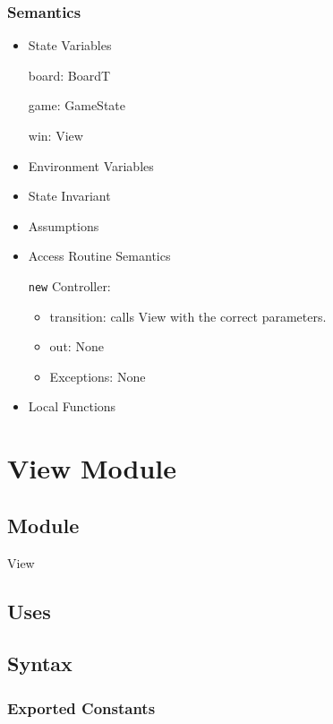 \documentclass[11pt]{article}
\begin{document}
\subsubsection*{Semantics}
\label{sec:orgfa1daa9}
\begin{itemize}
\item State Variables
\label{sec:orgae02d50}

board: BoardT

game: GameState

win: View

\item Environment Variables
\label{sec:orgac30971}
\item State Invariant
\label{sec:orgf3a78b5}
\item Assumptions
\label{sec:org0bff605}

\item Access Routine Semantics
\label{sec:orgf72d53e}

\texttt{new} Controller:
\begin{itemize}
\item transition: calls View with the correct parameters.
\item out: None
\item Exceptions: None
\end{itemize}
\item Local Functions
\label{sec:org14ce3f2}


\newpage
\end{itemize}
\section{View Module}
\label{sec:org80c417e}
\subsection*{Module}
\label{sec:org02f23da}
View
\subsection*{Uses}
\label{sec:orgcf1d67b}

\subsection*{Syntax}
\label{sec:org889da18}
\subsubsection*{Exported Constants}
\label{sec:org7481900}
\end{document}
